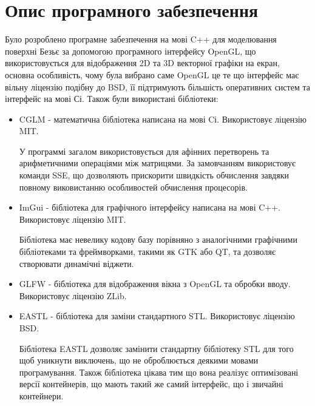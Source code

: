 \let\mypdfximage\pdfximage\def\pdfximage{\immediate\mypdfximage}\documentclass[14pt,a4paper]{extarticle}
\theoremstyle{definition}
\renewcommand{\[}{\begin{singlespace}\begin{equation*}}
\renewcommand{\]}{\end{equation*}\end{singlespace}}
\renewcommand{\+}{\discretionary{\mbox{\scriptsize$\hookleftarrow$}}{}{}}
\begin{document}
\section{Опис програмного забезпечення}

Було розроблено програмне забезпечення на мові C++ для моделювання поверхні Безьє за допомогою програмного інтерфейсу OpenGL, що використовується для відображення 2D та 3D векторної графіки на екран, основна особливість, чому була вибрано саме OpenGL це те що інтерфейс має вільну ліцензію подібну до BSD, її підтримують більшість оперативних систем та інтерфейс на мові Сі. Також були використані бібліотеки:

\begin{itemize}
\item CGLM - математична бібліотека написана на мові Cі. Використовує ліцензію MIT.

У программі загалом використовується для афінних перетворень та арифметичними операціями між матрицями. За замовчанням використовує команди SSE, що дозволяють прискорити швидкість обчислення завдяки повному виковистанню особливостей обчислення процесорів.

\item ImGui - бібліотека для графічного інтерфейсу написана на мові C++. Використовує ліцензію MIT.

Бібліотека має невелику кодову базу порівняно з аналогічними графічними бібліотеками та фреймворками, такими як GTK або QT, та дозволяє створювати динамічні віджети.

\item GLFW - бібліотека для відображення вікна з OpenGL та обробки вводу. Використовує ліцензію ZLib.

\item EASTL - бібліотека для заміни стандартного STL. Використовує ліцензію BSD.

Бібліотека EASTL дозволяє замінити стандартну бібліотеку STL для того щоб уникнути виключень, що не оброблюється деякими мовами програмування. Також бібліотека цікава тим що вона реалізує оптимізовані версії контейнерів, що мають такий же самий інтерфейс, що і звичайні контейнери.
\end{itemize}
\end{document}
